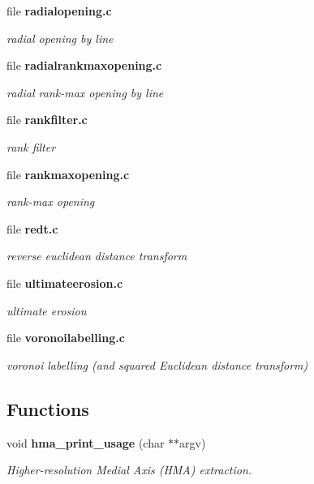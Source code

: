 \begin{CompactItemize}
\item 
file {\bf radialopening.c}
\begin{CompactList}\small\item\em radial opening by line \item\end{CompactList}

\item 
file {\bf radialrankmaxopening.c}
\begin{CompactList}\small\item\em radial rank-max opening by line \item\end{CompactList}

\item 
file {\bf rankfilter.c}
\begin{CompactList}\small\item\em rank filter \item\end{CompactList}

\item 
file {\bf rankmaxopening.c}
\begin{CompactList}\small\item\em rank-max opening \item\end{CompactList}

\item 
file {\bf redt.c}
\begin{CompactList}\small\item\em reverse euclidean distance transform \item\end{CompactList}

\item 
file {\bf ultimateerosion.c}
\begin{CompactList}\small\item\em ultimate erosion \item\end{CompactList}

\item 
file {\bf voronoilabelling.c}
\begin{CompactList}\small\item\em voronoi labelling (and squared Euclidean distance transform) \item\end{CompactList}

\end{CompactItemize}
\subsection*{Functions}
\begin{CompactItemize}
\item 
void {\bf hma\_\-print\_\-usage} (char $\ast$$\ast$argv)
\begin{CompactList}\small\item\em Higher-resolution Medial Axis (HMA) extraction. \item\end{CompactList}\end{CompactItemize}


